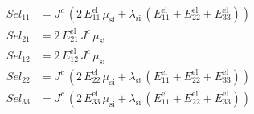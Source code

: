 \begin{align}
Sel_{11} &= J^{c}\,\left(2\,E_{11}^{\mathrm{el}}\,\mu _{\mathrm{si}}+\lambda _{\mathrm{si}}\,\left(E_{11}^{\mathrm{el}}+E_{22}^{\mathrm{el}}+E_{33}^{\mathrm{el}}\right)\right) \\ 
Sel_{21} &= 2\,E_{21}^{\mathrm{el}}\,J^{c}\,\mu _{\mathrm{si}} \\ 
Sel_{12} &= 2\,E_{12}^{\mathrm{el}}\,J^{c}\,\mu _{\mathrm{si}} \\ 
Sel_{22} &= J^{c}\,\left(2\,E_{22}^{\mathrm{el}}\,\mu _{\mathrm{si}}+\lambda _{\mathrm{si}}\,\left(E_{11}^{\mathrm{el}}+E_{22}^{\mathrm{el}}+E_{33}^{\mathrm{el}}\right)\right) \\ 
Sel_{33} &= J^{c}\,\left(2\,E_{33}^{\mathrm{el}}\,\mu _{\mathrm{si}}+\lambda _{\mathrm{si}}\,\left(E_{11}^{\mathrm{el}}+E_{22}^{\mathrm{el}}+E_{33}^{\mathrm{el}}\right)\right) 
\end{align}
